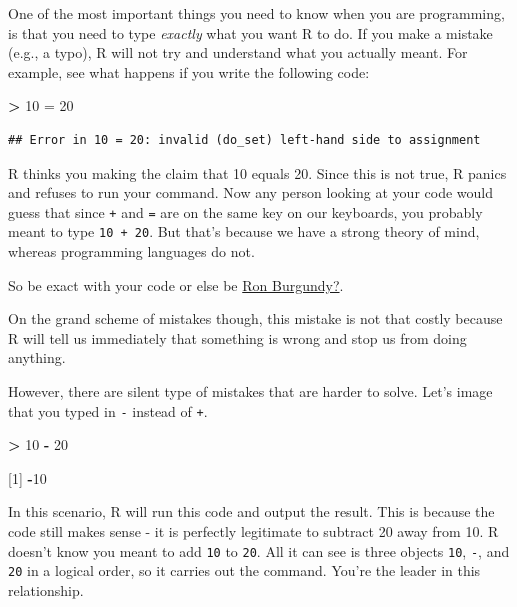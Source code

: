 \documentclass[
]{book}
\newenvironment{Shaded}{\begin{snugshade}}{\end{snugshade}}
\newcommand{\DecValTok}[1]{\textcolor[rgb]{0.00,0.00,0.81}{#1}}
\newcommand{\NormalTok}[1]{#1}
\newcommand{\OtherTok}[1]{\textcolor[rgb]{0.56,0.35,0.01}{#1}}
\newcommand{\SpecialCharTok}[1]{\textcolor[rgb]{0.81,0.36,0.00}{\textbf{#1}}}
\begin{document}
One of the most important things you need to know when you are programming, is that you need to type \emph{exactly} what you want R to do. If you make a mistake (e.g., a typo), R will not try and understand what you actually meant. For example, see what happens if you write the following code:

\begin{Shaded}
\begin{Highlighting}[]
\SpecialCharTok{\textgreater{}} \DecValTok{10} \OtherTok{=} \DecValTok{20}
\end{Highlighting}
\end{Shaded}

\begin{verbatim}
## Error in 10 = 20: invalid (do_set) left-hand side to assignment
\end{verbatim}

R thinks you making the claim that 10 equals 20. Since this is not true, R panics and refuses to run your command. Now any person looking at your code would guess that since \texttt{+} and \texttt{=} are on the same key on our keyboards, you probably meant to type \texttt{10\ +\ 20}. But that's because we have a strong theory of mind, whereas programming languages do not.

So be exact with your code or else be \href{https://www.youtube.com/watch?v=X3zfP14pLxc}{Ron Burgundy?}.

On the grand scheme of mistakes though, this mistake is not that costly because R will tell us immediately that something is wrong and stop us from doing anything.

However, there are silent type of mistakes that are harder to solve. Let's image that you typed in \texttt{-} instead of \texttt{+}.

\begin{Shaded}
\begin{Highlighting}[]
\SpecialCharTok{\textgreater{}} \DecValTok{10} \SpecialCharTok{{-}} \DecValTok{20}

\NormalTok{[}\DecValTok{1}\NormalTok{] }\SpecialCharTok{{-}}\DecValTok{10}
\end{Highlighting}
\end{Shaded}

In this scenario, R will run this code and output the result. This is because the code still makes sense - it is perfectly legitimate to subtract 20 away from 10. R doesn't know you meant to add \texttt{10} to \texttt{20}. All it can see is three objects \texttt{10}, \texttt{-}, and \texttt{20} in a logical order, so it carries out the command. You're the leader in this relationship.
\end{document}
